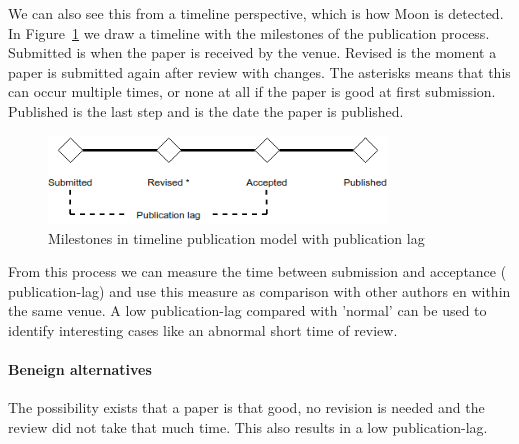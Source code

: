 \documentclass{ou-report}
\begin{document}
We can also see this from a timeline perspective, which is how Moon is 
detected. In Figure~\ref{fig:timeline} we draw a timeline with the milestones of 
the publication process. Submitted is when the paper is received by the venue. 
Revised is the moment a paper is submitted again after review with changes. The 
asterisks means that this can occur multiple times, or none at all if the paper 
is good at first submission. Published is the last step and is the date the 
paper is published.

\begin{figure}[H]
\centering
\includegraphics[width=9cm]{images/timeline.drawio.png}
\caption{Milestones in timeline publication model with publication lag}
\label{fig:timeline}
\end{figure}

From this process we can measure the time between submission and acceptance (
publication-lag) and use this measure as comparison with other authors en within 
the same venue. A low publication-lag compared with 'normal' can be used to 
identify interesting cases like an abnormal short time of review.

\paragraph{Beneign alternatives}
The possibility exists that a paper is that good, no revision is needed and the 
review did not take that much time. This also results in a low publication-lag.

\end{document}
